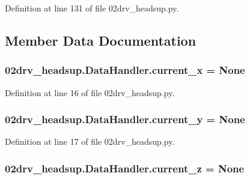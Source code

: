 Definition at line 131 of file 02drv\+\_\+headsup.\+py.



\subsection{Member Data Documentation}
\subsubsection[{\texorpdfstring{current\+\_\+x}{current_x}}]{\setlength{\rightskip}{0pt plus 5cm}02drv\+\_\+headsup.\+Data\+Handler.\+current\+\_\+x = None\hspace{0.3cm}{\ttfamily [static]}}\hypertarget{class02drv__headsup_1_1_data_handler_adb869357a6cf310f5b54b1d5029e058c}{}\label{class02drv__headsup_1_1_data_handler_adb869357a6cf310f5b54b1d5029e058c}


Definition at line 16 of file 02drv\+\_\+headsup.\+py.

\subsubsection[{\texorpdfstring{current\+\_\+y}{current_y}}]{\setlength{\rightskip}{0pt plus 5cm}02drv\+\_\+headsup.\+Data\+Handler.\+current\+\_\+y = None\hspace{0.3cm}{\ttfamily [static]}}\hypertarget{class02drv__headsup_1_1_data_handler_ad4d7b8fa098091aec5c4601dd19242a3}{}\label{class02drv__headsup_1_1_data_handler_ad4d7b8fa098091aec5c4601dd19242a3}


Definition at line 17 of file 02drv\+\_\+headsup.\+py.

\subsubsection[{\texorpdfstring{current\+\_\+z}{current_z}}]{\setlength{\rightskip}{0pt plus 5cm}02drv\+\_\+headsup.\+Data\+Handler.\+current\+\_\+z = None\hspace{0.3cm}{\ttfamily [static]}}\hypertarget{class02drv__headsup_1_1_data_handler_a6725250d984a2953d89b8a3c877985a6}{}\label{class02drv__headsup_1_1_data_handler_a6725250d984a2953d89b8a3c877985a6}


